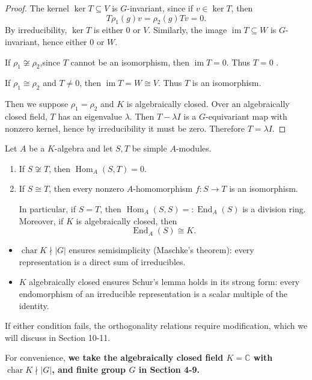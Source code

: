 \begin{proof}
The kernel \(\ker T \subseteq V\) is \(G\)-invariant, since if \(v \in \ker T\), then
\[
T \rho_1(g) v = \rho_2(g) T v = 0.
\]
By irreducibility, \(\ker T\) is either \(0\) or \(V\). Similarly, the image \(\operatorname{im} T \subseteq W\) is \(G\)-invariant, hence either \(0\) or \(W\).

If \(\rho_1 \not\cong \rho_2\),since $T$ cannot be an isomorphism, then \(\operatorname{im}T=0\). Thus $T=0$ .



If \(\rho_1 \cong \rho_2\) and \(T \neq 0\), then  $\operatorname{im}T=W\cong V$. Thus \(T\) is an isomorphism. 

Then we suppose \(\rho_1 = \rho_2\) and \(K\) is algebraically closed. Over an algebraically closed field, \(T\) has an eigenvalue \(\lambda\). Then \(T - \lambda I\) is a \(G\)-equivariant map with nonzero kernel, hence by irreducibility it must be zero. Therefore \(T = \lambda I\).
\end{proof}
\begin{lemma}
\label{Schur's Lemma, module form}
Let \(A\) be a \(K\)-algebra and let \(S, T\) be simple \(A\)-modules.
\begin{enumerate}
    \item If \(S \not\cong T\), then \(\operatorname{Hom}_A(S, T) = 0\).
   \item If \(S \cong T\), then every nonzero \(A\)-homomorphism \(f: S \to T\) is an isomorphism.

In particular, if \(S = T\), then \(\operatorname{Hom}_A(S, S)=:\operatorname{End}_A(S)\) is a division ring. 
Moreover, if \(K\) is algebraically closed, then
    \[
    \operatorname{End}_A(S) \cong K.
    \]
\end{enumerate}
\end{lemma}



\begin{remark}

\begin{itemize}
    \item \(\operatorname{char} K \nmid |G|\) ensures semisimplicity (Maschke's theorem): every representation is a direct sum of irreducibles.
    \item \(K\) algebraically closed ensures Schur's lemma holds in its strong form: every endomorphism of an irreducible representation is a scalar multiple of the identity.
\end{itemize}
If either condition fails, the orthogonality relations require modification, which we will discuss in Section 10-11.

For convenience, \textbf{we take the algebraically closed field $K=\mathbb{C}$ with \(\operatorname{char} K \nmid |G|\), and finite group $G$  in Section 4-9.}

\end{remark}


